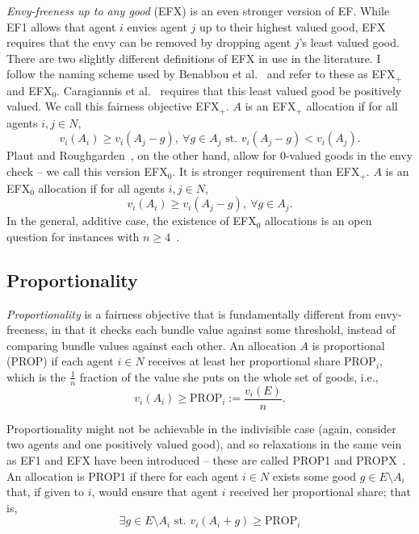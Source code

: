 \textit{Envy-freeness up to any good} (EFX) is an even stronger version of EF. While EF1 allows that agent $i$ envies agent $j$ up to their highest valued good, EFX requires that the envy can be removed by dropping agent $j$'s least valued good. There are two slightly different definitions of EFX in use in the literature. I follow the naming scheme used by Benabbou et al.~\cite{benabbou-2021} and refer to these as EFX$_+$ and EFX$_0$. Caragiannis et al.~\cite{caragiannis-Unreasonable} requires that this least valued good be positively valued. We call this fairness objective EFX$_+$. $A$ is an EFX$_+$ allocation if for all agents $i,j \in N$,
\begin{equation} \tag{EFX$_+$}
  v_i(A_i) \geq v_i(A_j - g),\ \forall g \in A_j \text{ st. } v_i(A_j-g) < v_i(A_j).
\end{equation}
Plaut and Roughgarden~\cite{plaut2017envyfreeness}, on the other hand, allow for 0-valued goods in the envy check -- we call this version EFX$_0$. It is stronger requirement than EFX$_+$. $A$ is an EFX$_0$ allocation if for all agents $i,j \in N$,
\begin{equation} \tag{EFX$_0$}
  v_i(A_i) \geq v_i(A_j - g),\ \forall g \in A_j.
\end{equation}
In the general, additive case, the existence of EFX$_0$ allocations is an open question for instances with $n\geq4$~\cite{amanatidis2022fair}.

\subsection{Proportionality}
\textit{Proportionality} is a fairness objective that is fundamentally different from envy-freeness, in that it checks each bundle value against some threshold, instead of comparing bundle values against each other. An allocation $A$ is proportional (PROP) if each agent $i\in N$ receives at least her proportional share PROP$_i$, which is the $\frac{1}{n}$ fraction of the value she puts on the whole set of goods, i.e.,
\begin{equation}\tag{PROP}
  v_i(A_i)\geq \text{PROP}_i := \frac{v_i(E)}{n}.
\end{equation}

Proportionality might not be achievable in the indivisible case (again, consider two agents and one positively valued good), and so relaxations in the same vein as EF1 and EFX have been introduced -- these are called PROP1 and PROPX~\cite{amanatidis2022fair}. An allocation is PROP1 if there for each agent $i \in N$ exists some good $g\in E\setminus A_i$ that, if given to $i$, would ensure that agent $i$ received her proportional share; that is, 
\begin{equation}\tag{PROP1}
  \exists g\in E\setminus A_i\text{ st. }v_i(A_i+g)\geq\text{PROP}_i
\end{equation}

